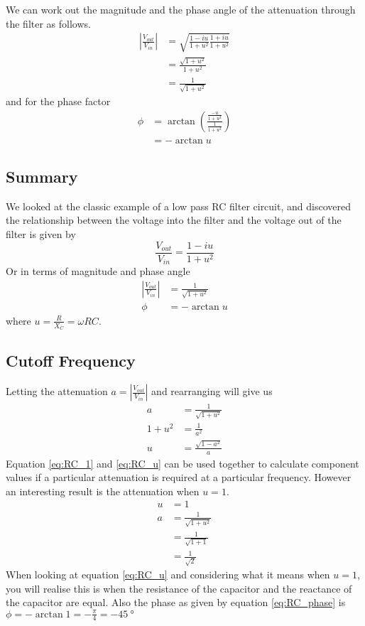We can work out the magnitude and the phase angle of the attenuation through the
filter as follows.
\begin{align}
  \left| \frac{V_{out}}{V_{in}}\right| &= \sqrt{\frac{1-iu}{1+u^2}\frac{1+iu}{1+u^2}}\nonumber \\
 &= \frac{\sqrt{1+u^2}}{1+u^2} \nonumber \\
 &= \frac{1}{\sqrt{1+u^2}} \label{eq:RC_mag}
\end{align}
and for the phase factor
\begin{align}
  \phi &= \arctan\left(\frac{\frac{-u}{1+u^2}}{\frac{1}{1+u^2}}\right) \nonumber \\
  &= -\arctan u \label{eq:RC_phase}
\end{align}

\begin{framed}
\subsection*{Summary}
We looked at the classic example of a low pass RC filter circuit, and discovered
the relationship between the voltage into the filter and the voltage out of the
filter is given by
\begin{equation}
  \frac{V_{out}}{V_{in}} = \frac{1-iu}{1+u^2} \nonumber
\end{equation}
Or in terms of magnitude and phase angle
\begin{align}
  \left|\frac{V_{out}}{V_{in}}\right| &= \frac{1}{\sqrt{1+u^2}} \nonumber \\
  \phi &= - \arctan u \nonumber
\end{align}
where $u=\frac{R}{X_C}=\omega R C$.
\end{framed}

\subsection{Cutoff Frequency}
Letting the attenuation $a=\left| \frac{V_{out}}{V_{in}}\right|$ and rearranging will give us
\begin{align}
  a &= \frac{1}{\sqrt{1+u^2}} \nonumber \\
  1+u^2 &= \frac{1}{a^2} \nonumber \\
  u &= \frac{\sqrt{1-a^2}}{a} \label{eq:RC_1}
\end{align}
Equation \ref{eq:RC_1} and \ref{eq:RC_u} can be used together to calculate component values if a particular attenuation is required at a particular frequency. However an interesting result is the attenuation when $u=1$.
\begin{align}
  u & = 1 \nonumber \\
  a &= \frac{1}{\sqrt{1+u^2}} \nonumber \\
   &= \frac{1}{\sqrt{1+1}} \nonumber \\
  &= \frac{1}{\sqrt{2}} \label{eq:RC_cuttoff_attenuation}
\end{align}
When looking at equation \ref{eq:RC_u} and considering what it means when $u=1$, you will realise this is when the resistance of the capacitor and the
reactance of the capacitor are equal. Also the phase as given by equation \ref{eq:RC_phase} is $\phi=-\arctan{1}=-\frac{\pi}{4}=-\SI{45}{\degree}$

